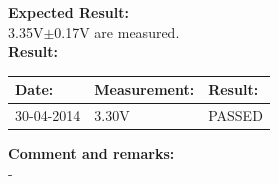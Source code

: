 \begin{figure}[H]
	\centering

\end{figure}

\textbf{Expected Result:}\\
3.35V$\pm$0.17V are measured.\\

\textbf{Result:}
\begin{table}[H]
\centering
\begin{tabular}{|p{2cm}|p{3cm}|p{2cm}|}\hline
\textbf{Date:} & \textbf{Measurement:} & \textbf{Result:} \\ \hline
30-04-2014 & 3.30V & PASSED \\ \hline
\end{tabular}
\end{table}

\textbf{Comment and remarks:}\\
-\\


